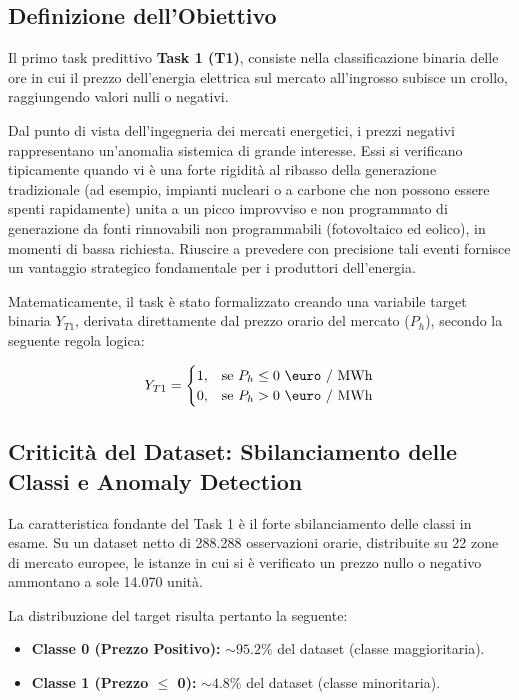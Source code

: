 \subsection{Definizione dell'Obiettivo}
Il primo task predittivo \textbf{Task 1 (T1)}, consiste nella classificazione binaria delle ore in cui il prezzo dell'energia elettrica sul mercato all'ingrosso subisce un crollo, raggiungendo valori nulli o negativi. 

Dal punto di vista dell'ingegneria dei mercati energetici, i prezzi negativi rappresentano un'anomalia sistemica di grande interesse. Essi si verificano tipicamente quando vi è una forte rigidità al ribasso della generazione tradizionale (ad esempio, impianti nucleari o a carbone che non possono essere spenti rapidamente) unita a un picco improvviso e non programmato di generazione da fonti rinnovabili non programmabili (fotovoltaico ed eolico), in momenti di bassa richiesta. Riuscire a prevedere con precisione tali eventi fornisce un vantaggio strategico fondamentale per i produttori dell'energia.

Matematicamente, il task è stato formalizzato creando una variabile target binaria $Y_{T1}$, derivata direttamente dal prezzo orario del mercato ($P_{h}$), secondo la seguente regola logica:

\begin{equation}
Y_{T1} = 
\begin{cases} 
1, & \text{se } P_{h} \leq 0 \text{ \euro / MWh} \\
0, & \text{se } P_{h} > 0 \text{ \euro / MWh}
\end{cases}
\end{equation}

\subsection{Criticità del Dataset: Sbilanciamento delle Classi e Anomaly Detection}
\label{subsec:t1_sbilanciamento}
La caratteristica fondante del Task 1 è il forte sbilanciamento delle classi in esame. Su un dataset netto di 288.288 osservazioni orarie, distribuite su 22 zone di mercato europee, le istanze in cui si è verificato un prezzo nullo o negativo ammontano a sole 14.070 unità. 

La distribuzione del target risulta pertanto la seguente:
\begin{itemize}
    \item \textbf{Classe 0 (Prezzo Positivo):} $\sim 95.2\%$ del dataset (classe maggioritaria).
    \item \textbf{Classe 1 (Prezzo $\leq$ 0):} $\sim 4.8\%$ del dataset (classe minoritaria).
\end{itemize}

